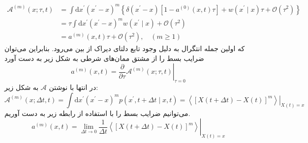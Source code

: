 $$
\begin{aligned} \mathcal{A}^{(m)}(x ; \tau, t) &=\int \mathrm{d} x^{\prime}\left(x^{\prime}-x\right)^{m}\left\{\delta\left(x^{\prime}-x\right)\left[1-a^{(0)}(x, t) \tau\right]+w\left(x^{\prime} \mid x\right) \tau+\mathcal{O}\left(\tau^{2}\right)\right\} \\ &=\tau \int \mathrm{d} x^{\prime}\left(x^{\prime}-x\right)^{m} w\left(x^{\prime} \mid x\right)+\mathcal{O}\left(\tau^{2}\right) \\ &=a^{(m)}(x, t) \tau+\mathcal{O}\left(\tau^{2}\right), \quad(m \geq 1) \end{aligned}
$$
که اولین جمله انتگرال به دلیل وجود تابع دلتای دیراک از بین می‌رود. بنابراین می‌توان ضرایب بسط را از مشتق ممان‌های شرطی به شکل زیر به دست آورد
\begin{equation}
a^{(m)}(x, t)=\left.\frac{\partial}{\partial \tau} \mathcal{A}^{(m)}(x ; \tau, t)\right|_{\tau=0}
\label{cond_moment_km}
\end{equation}
در انتها با نوشتن $\mathcal{A}$ به شکل زیر:
$$
\mathcal{A}^{(m)}(x ; \Delta t, t)=\int \mathrm{d} x^{\prime}\left(x^{\prime}-x\right)^{m} p\left(x^{\prime}, t+\Delta t  \mid  x, t\right)=\left.\left\langle[X(t+\Delta t)-X(t)]^{m}\right\rangle\right|_{X(t)=x}
$$
می‌توانیم ضرایب بسط را با استفاده از رابطه زیر به دست آوریم.
\begin{equation}
a^{(m)}(x, t)=\left.\lim _{\Delta t \rightarrow 0} \frac{1}{\Delta t}\left\langle[X(t+\Delta t)-X(t)]^{m}\right\rangle\right|_{X(t)=x}
\label{exp_coef}
\end{equation}

